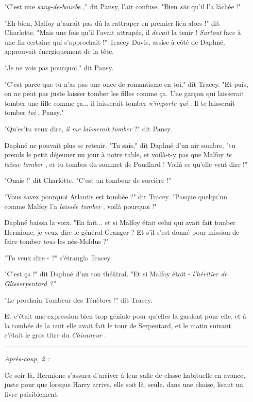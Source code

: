 "C'est une \emph{sang-de-bourbe} ," dit Pansy, l'air confuse. "Bien \emph{sûr}  qu'il l'a lâchée !"

"Eh bien, Malfoy n'aurait pas dû la rattraper en premier lieu alors !" dit Charlotte. "Mais une fois qu'il l'avait attrapée, il \emph{devait}  la tenir ! \emph{Surtout}  face à une fin certaine qui s'approchait !" Tracey Davis, assise à côté de Daphné, approuvait énergiquement de la tête.

"Je ne vois pas pourquoi," dit Pansy.

"C'est parce que tu n'as pas une once de romantisme en toi," dit Tracey. "Et puis, on ne peut pas juste laisser tomber les filles comme ça. Une garçon qui laisserait tomber une fille comme ça... il laisserait tomber \emph{n'importe qui} . Il te laisserait tomber \emph{toi} , Pansy."

"Qu'es'tu veux dire, \emph{il me laisserait tomber}  ?" dit Pansy.

Daphné ne pouvait plus se retenir. "Tu sais," dit Daphné d'un air sombre, "tu prends le petit déjeuner un jour à notre table, et voilà-t-y pas que Malfoy \emph{te laisse tomber} , et tu tombes du sommet de Poudlard ! Voilà ce qu'elle veut dire !"

"Ouais !" dit Charlotte. "C'est un tombeur de sorcière !"

"Vous savez pourquoi Atlantis est tombée ?" dit Tracey. "Pasque quelqu'un comme Malfoy l'a \emph{laissée tomber} , voilà pourquoi !"

Daphné baissa la voix. "En fait... et si Malfoy était celui qui avait fait tomber Hermione, je veux dire le général Granger ? Et s'il s'est donné pour mission de faire tomber \emph{tous}  les nés-Moldus ?"

"Tu veux dire - ?" s'étrangla Tracey.

"C'est ça !" dit Daphné d'un ton théâtral. "Et si Malfoy était - \emph{l'héritier de Glisserpentard ?"} 

"Le prochain Tombeur des Ténèbres !" dit Tracey.

Et c'était une expression bien trop géniale pour qu'elles la gardent pour elle, et à la tombée de la nuit elle avait fait le tour de Serpentard, et le matin suivant c'était le gros titre du \emph{Chicaneur} .
\par\noindent\rule{\textwidth}{0.4pt}
\emph{Après-coup, 2 :} 

Ce soir-là, Hermione s'assura d'arriver à leur salle de classe habituelle en avance, juste pour que lorsque Harry arrive, elle soit là, seule, dans une chaise, lisant un livre paisiblement.

